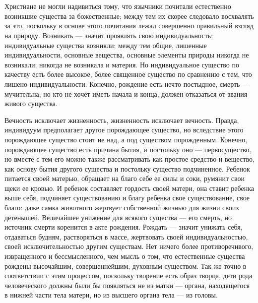 \documentclass[12pt]{article}
\begin{document}
\section{}

Христиане не могли надивиться тому, что язычники почитали естественно возникшие существа за божественные; между тем их скорее следовало восхвалять за это, поскольку в основе этого почитания лежал совершенно правильный взгляд на природу. Возникать --- значит проявлять свою индивидуальность; индивидуальные существа возникли; между тем общие, лишенные индивидуальности, основные вещества, основные элементы природы никогда не возникали; никогда не возникала и материя. Но индивидуальное существо по качеству есть более высокое, более священное существо по сравнению с тем, что лишено индивидуальности. Конечно, рождение есть нечто постыдное, смерть --- мучительна; но кто не хочет иметь начала и конца, должен отказаться от звания живого существа.

Вечность исключает жизненность, жизненность исключает вечность. Правда, индивидуум предполагает другое порождающее существо, но вследствие этого порождающее существо стоит не над, а под существом порожденным. Конечно, порождающее существо есть причина бытия, и постольку оно --- первосущество, но вместе с тем его можно также рассматривать как простое средство и вещество, как основу бытия другого существа и постольку существо подчиненное. Ребенок питается своей матерью, обращает на благо себе ее силы и соки, румянит свои щеки ее кровью. И ребенок составляет гордость своей матери, она ставит ребенка выше себя, подчиняет существованию и благу ребенка свое существование, свое благо: даже самка животного жертвует собственной жизнью для жизни своих детенышей. Величайшее унижение для всякого существа --- его смерть, но источник смерти коренится в акте рождения. Рождать --- значит унижать себя, отдаваться будням, растворяться в массе, жертвовать своей индивидуальностью, своей исключительностью другим существам. Нет ничего более противоречивого, извращенного и бессмысленного, чем мысль о том, что естественные существа рождены высочайшим, совершеннейшим, духовным существом. Так же точно в соответствии с этим процессом, поскольку творение есть образ творца, дети рода человеческого должны были бы появляться не из матки --- органа, находящегося в нижней части тела матери, но из высшего органа тела --- из головы.



\section{}
\end{document}
